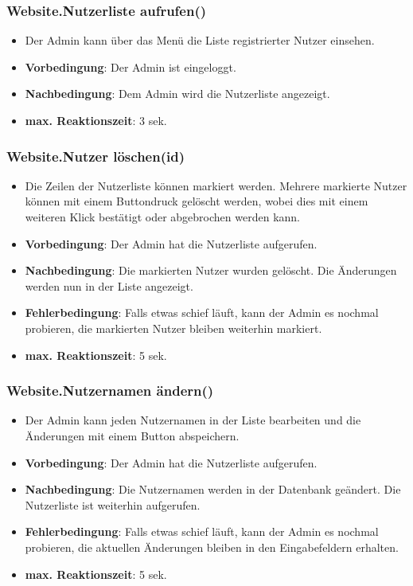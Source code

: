 \documentclass[fontsize=12pt,paper=a4,twoside]{scrartcl}
\begin{document}
\subsubsection{Website.Nutzerliste aufrufen()}
\begin{itemize}
\item Der Admin kann über das Menü die Liste registrierter Nutzer einsehen.
\item \textbf{Vorbedingung}: Der Admin ist eingeloggt.
\item \textbf{Nachbedingung}: Dem Admin wird die Nutzerliste angezeigt. 
\item \textbf{max. Reaktionszeit}: 3 sek.
\end{itemize}

\subsubsection{Website.Nutzer löschen(id)}
\begin{itemize}
\item Die Zeilen der Nutzerliste können markiert werden. Mehrere markierte Nutzer können mit einem Buttondruck gelöscht werden, wobei dies mit einem weiteren Klick bestätigt oder abgebrochen werden kann.
\item \textbf{Vorbedingung}: Der Admin hat die Nutzerliste aufgerufen.
\item \textbf{Nachbedingung}: Die markierten Nutzer wurden gelöscht. Die Änderungen werden nun in der Liste angezeigt.
\item \textbf{Fehlerbedingung}: Falls etwas schief läuft, kann der Admin es nochmal probieren, die markierten Nutzer bleiben weiterhin markiert.
\item \textbf{max. Reaktionszeit}: 5 sek.
\end{itemize}

\subsubsection{Website.Nutzernamen ändern()}
\begin{itemize}
\item Der Admin kann jeden Nutzernamen in der Liste bearbeiten und die Änderungen mit einem Button abspeichern.
\item \textbf{Vorbedingung}: Der Admin hat die Nutzerliste aufgerufen.
\item \textbf{Nachbedingung}: Die Nutzernamen werden in der Datenbank geändert. Die Nutzerliste ist weiterhin aufgerufen.
\item \textbf{Fehlerbedingung}: Falls etwas schief läuft, kann der Admin es nochmal probieren, die aktuellen Änderungen bleiben in den Eingabefeldern erhalten.
\item \textbf{max. Reaktionszeit}: 5 sek.
\end{itemize}
\end{document}
